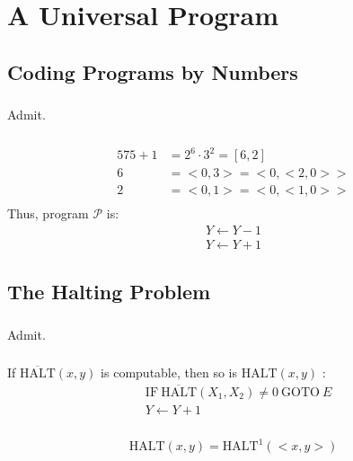 \chapter{A Universal Program}


\section{Coding Programs by Numbers}

\subsection{}
Admit.

\subsection{}
\begin{align*}
  575+1 & = 2^6 \cdot 3^2 = [6,2] \\
  6     & = <0,3> = <0,<2,0>> \\
  2     & = <0,1> = <0,<1,0>> \\
\end{align*}
Thus, program $\mathscr{P}$ is:
\begin{align*}
  Y \gets Y - 1 \\
  Y \gets Y + 1
\end{align*}



\section{The Halting Problem}

\subsection{}
Admit.

\subsection{}
If $ \mathrm{\overline{HALT}}(x,y) $ is computable, then so is
$ \mathrm{HALT}(x,y)$ :
\begin{align*}
  & \mathrm{IF}\ \mathrm{\overline{HALT}}(X_1,X_2)\neq 0  \ \mathrm{GOTO}\ E \\
  & Y \gets Y + 1
\end{align*}


\subsection{}
\[ \mathrm{HALT}(x,y) = \mathrm{HALT}^1(<x,y>) \]


